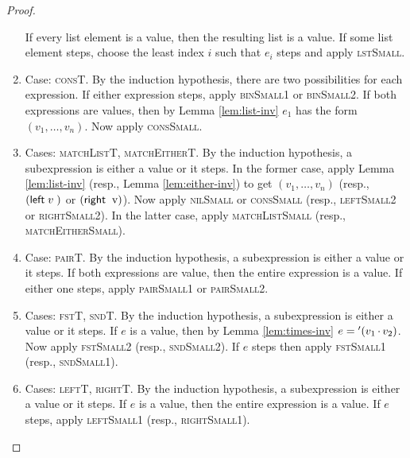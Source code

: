 \documentclass{homework}
\begin{document}
\begin{proof}
\begin{enumerate}
    If every list element is a value, then the resulting list is a value.
    If some list element steps, choose the least index $i$ such that $e_{i}$ steps and apply \textsc{lstSmall}.
  \item Case: \textsc{consT}.
    By the induction hypothesis, there are two possibilities for each expression.
    If either expression steps, apply \textsc{binSmall1} or \textsc{binSmall2}.
    If both expressions are values, then by Lemma \ref{lem:list-inv} $e_{1}$ has the form $(v_{1},\ldots,v_{n})$.
    Now apply \textsc{consSmall}.
  \item Cases: \textsc{matchListT}, \textsc{matchEitherT}.
    By the induction hypothesis, a subexpression is either a value or it steps.
    In the former case, apply Lemma \ref{lem:list-inv} (resp., Lemma \ref{lem:either-inv}) to get $(v_{1},\ldots,v_{n})$ (resp., $\inl{v}$ or $\inr{v}$).
    Now apply \textsc{nilSmall} or \textsc{consSmall} (resp., \textsc{leftSmall2} or \textsc{rightSmall2}).
    In the latter case, apply \textsc{matchListSmall} (resp., \textsc{matchEitherSmall}).
  \item Case: \textsc{pairT}.
    By the induction hypothesis, a subexpression is either a value or it steps.
    If both expressions are value, then the entire expression is a value.
    If either one steps, apply \textsc{pairSmall1} or \textsc{pairSmall2}.
  \item Cases: \textsc{fstT}, \textsc{sndT}.
    By the induction hypothesis, a subexpression is either a value or it steps.
    If $e$ is a value, then by Lemma \ref{lem:times-inv} $e = {}'(v_{1} \mathop{.} v_{2})$.
    Now apply \textsc{fstSmall2} (resp., \textsc{sndSmall2}).
    If $e$ steps then apply \textsc{fstSmall1} (resp., \textsc{sndSmall1}).
  \item Cases: \textsc{leftT}, \textsc{rightT}.
    By the induction hypothesis, a subexpression is either a value or it steps.
    If $e$ is a value, then the entire expression is a value.
    If $e$ steps, apply \textsc{leftSmall1} (resp., \textsc{rightSmall1}).
  \end{enumerate}
\end{proof}
\end{document}
